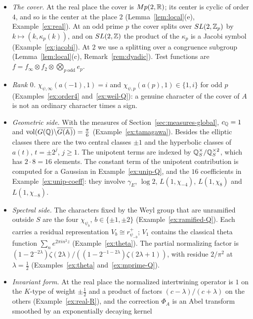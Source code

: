 \begin{itemize}
\item \emph{The cover.} At the real place the cover is $Mp(2,\mathbb{R})$; its
  center is cyclic of order $4$, and so is the center at the place $2$
  (Lemma~\ref{lem:local}(e), Example~\ref{ex:real}). At an odd prime $p$
  the cover splits over $SL(2,\mathbb{Z}_p)$ by $k\mapsto(k,\kappa_p(k))$, and on
  $SL(2,\mathbb{Z})$ the product of the $\kappa_p$ is a Jacobi symbol
  (Example~\ref{ex:jacobi}). At $2$ we use a splitting over a congruence
  subgroup (Lemma~\ref{lem:local}(c), Remark~\ref{rem:dyadic}). Test functions are
  $f=f_\infty\otimes f_2\otimes\bigotimes_{p\ \mathrm{odd}}e_p$.
\item \emph{Rank $0$.} $\chi_{\psi,\infty}(a(-1),1)=i$ and
  $\chi_{\psi,p}(a(p),1)\in\{1,i\}$ for odd $p$
  (Examples~\ref{ex:order4} and~\ref{ex:weil-Q}): a genuine character of
  the cover of $A$ is not an ordinary character times a sign.
\item \emph{Geometric side.} With the measures of
  Section~\ref{sec:measures-global}, $c_{\mathbb{Q}}=1$ and
  $\operatorname{vol}(G(\mathbb{Q})\backslash\overline{G(\mathbb{A})})=\frac\pi6$
  (Example~\ref{ex:tamagawa}). Besides the elliptic classes
  there are the two central classes $\pm1$ and the hyperbolic classes of
  $a(t)$, $t=\pm2^j$, $j\ge1$. The unipotent terms are indexed by
  $\mathbb{Q}_S^\times/\mathbb{Q}_S^{\times2}$, which has $2\cdot8=16$ elements. The
  constant term of the unipotent contribution is computed for a Gaussian
  in Example~\ref{ex:unip-Q}, and the $16$ coefficients in
  Example~\ref{ex:unip-coeff}: they involve $\gamma_E$, $\log2$,
  $L(1,\chi_{-4})$, $L(1,\chi_8)$ and $L(1,\chi_{-8})$.
\item \emph{Spectral side.} The characters fixed by the Weyl group that
  are unramified outside $S$ are the four $\chi_{\psi_b}$,
  $b\in\{\pm1,\pm2\}$ (Example~\ref{ex:ramified-Q}). Each carries a
  residual representation $V_b\cong r^+_{\psi_{-b}}$; $V_1$ contains the
  classical theta function $\sum_ne^{2\pi in^2z}$
  (Example~\ref{ex:theta}). The partial normalizing factor is
  $(1-2^{-2\lambda})\zeta(2\lambda)/((1-2^{-1-2\lambda})\zeta(2\lambda+1))$,
  with residue $2/\pi^2$ at $\lambda=\frac12$
  (Examples~\ref{ex:theta} and~\ref{ex:mprime-Q}).
\item \emph{Invariant form.} At the real place the normalized
  intertwining operator is $1$ on the $K$-type of weight $\pm\frac12$ and
  a product of factors $(c-\lambda)/(c+\lambda)$ on the others
  (Example~\ref{ex:real-R}), and the correction $\Phi_A$ is an Abel
  transform smoothed by an exponentially decaying kernel

\end{itemize}
